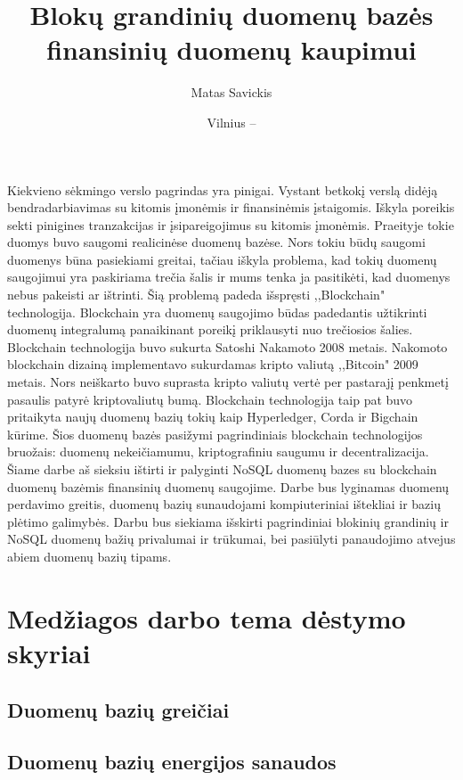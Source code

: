 \documentclass{VUMIFPSkursinis}
\title{Blokų grandinių duomenų bazės finansinių duomenų kaupimui}
\author{Matas Savickis}
\date{Vilnius – \the\year}
\begin{document}
\maketitle

\tableofcontents

Kiekvieno sėkmingo verslo pagrindas yra pinigai. Vystant betkokį verslą didėją bendradarbiavimas 
su kitomis įmonėmis ir finansinėmis įstaigomis. Iškyla poreikis sekti pinigines tranzakcijas ir įsipareigojimus 
su kitomis įmonėmis. Praeityje tokie duomys buvo saugomi realicinėse duomenų bazėse. Nors tokiu būdų saugomi
duomenys būna pasiekiami greitai, tačiau iškyla problema, kad tokių duomenų saugojimui yra paskiriama trečia 
šalis ir mums tenka ja pasitikėti, kad duomenys nebus pakeisti ar ištrinti. Šią problemą padeda išspręsti ,,Blockchain" 
technologija. Blockchain yra duomenų saugojimo būdas padedantis užtikrinti duomenų integralumą
panaikinant poreikį priklausyti nuo trečiosios šalies. Blockchain technologija buvo sukurta Satoshi Nakamoto 2008 metais.
Nakomoto blockchain dizainą implementavo sukurdamas kripto valiutą ,,Bitcoin" 2009 metais. Nors neiškarto buvo suprasta 
kripto valiutų vertė per pastarajį penkmetį pasaulis patyrė kriptovaliutų bumą. Blockchain technologija taip pat buvo pritaikyta
naujų duomenų bazių tokių kaip Hyperledger, Corda ir Bigchain kūrime. Šios duomenų bazės pasižymi pagrindiniais blockchain
technologijos bruožais: duomenų nekeičiamumu, kriptografiniu saugumu ir decentralizacija. Šiame darbe aš sieksiu ištirti ir palyginti
NoSQL duomenų bazes su blockchain duomenų bazėmis finansinių duomenų saugojime. Darbe bus lyginamas duomenų perdavimo greitis, 
duomenų bazių sunaudojami kompiuteriniai ištekliai ir bazių plėtimo galimybės. Darbu bus siekiama išskirti pagrindiniai blokinių grandinių 
ir NoSQL duomenų bažių privalumai ir trūkumai, bei pasiūlyti panaudojimo atvejus abiem duomenų bazių tipams.


\section{Medžiagos darbo tema dėstymo skyriai}

\subsection{Duomenų bazių greičiai}
\subsection{Duomenų bazių energijos sanaudos}
\end{document}
